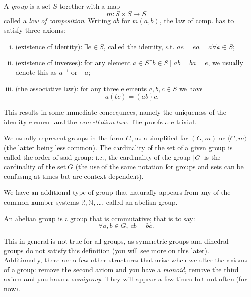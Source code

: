 \documentclass[12pt,oneside]{report}
\begin{document}
\begin{definition}
  A \textit{group} is a set \( S \) together with a map
  \begin{displaymath}
    m: S\times S \to  S
  \end{displaymath}
  called a \textit{law of composition}. Writing \( ab \) for \( m(a,b) \), the law of comp. has to satisfy three axioms:
  \begin{enumerate}[i.]
    \item (existence of identity): \( \exists e \in  S \), called the identity, s.t. \( ae=ea=a \forall a\in S \);
    \item (existence of inverses): for any element \( a \in S \exists b \in  S \mid  ab=ba=e\), we usually denote this as \( a^{-1} \) or \( -a \);
    \item (the associative law): for any three elements \( a,b,c \in  S \) we have \[
      a(bc)=(ab)c
    .\] 
  \end{enumerate}
\end{definition}

This results in some immediate concequnces, namely the uniqueness of the identity element and the \textit{cancellation law}. The proofs are trivial. 

We usually represent groups in the form \( G \), as a simplified for \( (G,m) \) or \( \langle G,m \rangle \) (the latter being less common). The cardinality of the set of a given group is called the order of said group: i.e., the cardinality of the group \( |G| \) is the cardinality of the set \( G \) (the use of the same notation for groups and sets can be confusing at times but are context dependent). 

We have an additional type of group that naturally appears from any of the common number systems \( \mathbb{R},\mathbb{N},\ldots  \), called an abelian group.

\begin{definition}
  An abelian group is a group that is commutative; that is to say:
  \begin{displaymath}
    \forall a,b \in  G, \, ab=ba.
  \end{displaymath}
  
\end{definition}

This in general is not true for all groups, as symmetric groups and dihedral groups do not satisfy this definition (you will see more on this later). Additionally, there are a few other structures that arise when we alter the axioms of a group: remove the second axiom and you have a \textit{monoid}, remove the third axiom and you have a \textit{semigroup}. They will appear a few times but not often (for now).
\end{document}
